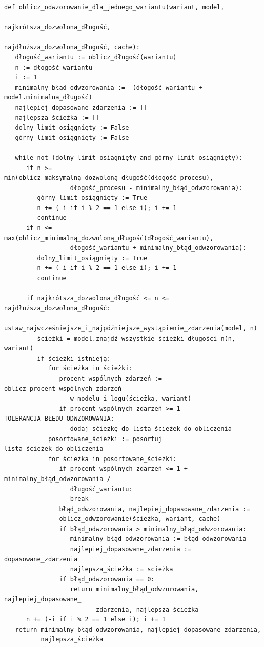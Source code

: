 \lstset{caption=Pseudokod obliczania odwzorowania dla jednego wariantu, captionpos=b}
\lstset{label=src:oodjw, frame=single}
\begin{lstlisting}
def oblicz_odwzorowanie_dla_jednego_wariantu(wariant, model, 
                                            najkrótsza_dozwolona_długość, 
                                            najdłuższa_dozwolona_długość, cache):
   dłogość_wariantu := oblicz_długość(wariantu)
   n := dłogość_wariantu
   i := 1
   minimalny_błąd_odwzorowania := -(dłogość_wariantu + model.minimalna_długość)
   najlepiej_dopasowane_zdarzenia := []
   najlepsza_ścieżka := []
   dolny_limit_osiągnięty := False
   górny_limit_osiągnięty := False
   
   while not (dolny_limit_osiągnięty and górny_limit_osiągnięty):
      if n >= min(oblicz_maksymalną_dozwoloną_długość(dłogość_procesu), 
                  dłogość_procesu - minimalny_błąd_odwzorowania):
         górny_limit_osiągnięty := True
         n += (-i if i % 2 == 1 else i); i += 1
         continue
      if n <= max(oblicz_minimalną_dozwoloną_długość(dłogość_wariantu), 
                  dłogość_wariantu + minimalny_błąd_odwzorowania):
         dolny_limit_osiągnięty := True
         n += (-i if i % 2 == 1 else i); i += 1
         continue
         
      if najkrótsza_dozwolona_długość <= n <= najdłuższa_dozwolona_długość:
         ustaw_najwcześniejsze_i_najpóźniejsze_wystąpienie_zdarzenia(model, n)
         ścieżki = model.znajdź_wszystkie_ścieżki_długości_n(n, wariant)
         if ścieżki istnieją:
            for ścieżka in ścieżki:
               procent_wspólnych_zdarzeń := oblicz_procent_wspólnych_zdarzeń_
                  w_modelu_i_logu(ścieżka, wariant)
               if procent_wspólnych_zdarzeń >= 1 - TOLERANCJA_BŁĘDU_ODWZOROWANIA:
                  dodaj sćiezkę do lista_ścieżek_do_obliczenia
            posortowane_ścieżki := posortuj lista_ścieżek_do_obliczenia
            for ścieżka in posortowane_ścieżki:
               if procent_wspólnych_zdarzeń <= 1 + minimalny_błąd_odwzorowania /
                  długość_wariantu:
                  break
               błąd_odwzorowania, najlepiej_dopasowane_zdarzenia :=
               oblicz_odwzorowanie(ścieżka, wariant, cache)
               if błąd_odwzorowania > minimalny_błąd_odwzorowania:
                  minimalny_błąd_odwzorowania := błąd_odwzorowania
                  najlepiej_dopasowane_zdarzenia := dopasowane_zdarzenia
                  najlepsza_ścieżka := scieżka
               if błąd_odwzorowania == 0:
                  return minimalny_błąd_odwzorowania, najlepiej_dopasowane_
                         zdarzenia, najlepsza_ścieżka
      n += (-i if i % 2 == 1 else i); i += 1
   return minimalny_błąd_odwzorowania, najlepiej_dopasowane_zdarzenia, 
          najlepsza_ścieżka
\end{lstlisting}

